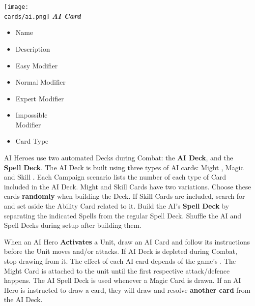 \begin{multicols}{2}
\begin{multicols*}{2}
  \begin{center}
    \vspace*{-1.5em}\texttt{[image: \\cards/ai.png]}
    \phantom{\ldots\ldots}\footnotesize{\textbf{\textit{\textcolor{darkcandyapplered}{AI Card}}}}
  \end{center}
  \vspace*{\fill}
  \columnbreak
  \scriptsize
  \begin{itemize}[itemsep=0pt]
    \item[\textbf{1.}] Name
    \item[\textbf{2.}] Description
    \item[\textbf{3.}] Easy Modifier
    \item[\textbf{4.}] Normal Modifier
    \item[\textbf{5.}] Expert Modifier
    \item[\textbf{6.}] Impossible\\Modifier
    \item[\textbf{7.}] Card Type
  \end{itemize}\vspace*{\fill}
\end{multicols*}

AI Heroes use two automated Decks during Combat: the \textbf{AI Deck}, and the \textbf{Spell Deck}.
The AI Deck is built using three types of AI cards: Might , Magic  and Skill .
Each Campaign scenario lists the number of each type of Card included in the AI Deck.
Might  and Skill  Cards have two variations. Choose these cards \textbf{randomly} when building the Deck.
If Skill Cards are included, search for and set aside the Ability Card related to it.
Build the AI's \textbf{Spell Deck} by separating the indicated Spells from the regular Spell Deck.
Shuffle the AI and Spell Decks during setup after building them.

When an AI Hero \textbf{Activates} a Unit, draw an AI Card and follow its instructions before the Unit moves and/or attacks.
If AI Deck is depleted during Combat, stop drawing from it.
The effect of each AI card depends of the game's .
The Might Card  is attached to the unit until the first respective attack/defence happens.
The AI Spell Deck is used whenever a Magic Card  is drawn.
If an AI Hero is instructed to draw a card, they will draw and resolve \textbf{another card} from the AI Deck.


\end{multicols}
